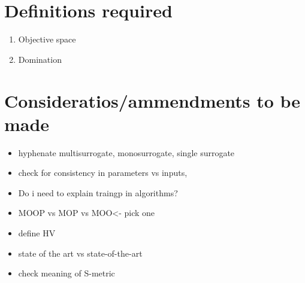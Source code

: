 \documentclass[runningheads]{llncs}
\begin{document}
\section{Definitions required}
\begin{enumerate}
    \item Objective space
    \item Domination
\end{enumerate}


\section{Consideratios/ammendments to be made}
\begin{itemize}
    \item hyphenate multisurrogate, monosurrogate, single surrogate
    \item check for consistency in parameters vs inputs, 
    \item Do i need to explain traingp in algorithms?
    \item MOOP vs MOP vs MOO<- pick one
    \item define HV
    \item state of the art vs state-of-the-art
    \item check meaning of S-metric
\end{itemize}

\clearpage


\end{document}
